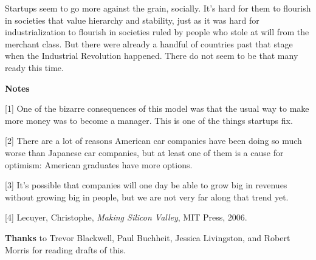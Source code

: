 Startups
                  seem to go more against the grain, socially. It's hard for
                  them to flourish in societies that value hierarchy and
                  stability, just as it was hard for industrialization to
                  flourish in societies ruled by people who stole at will from
                  the merchant class. But there were already a handful of
                  countries past that stage when the Industrial Revolution
                  happened. There do not seem to be that many ready this
                  time.








                  \textbf{Notes}

[1] One of the bizarre consequences of this model was that the
                  usual way to make more money was to become a manager. This is
                  one of the things startups fix.

[2] There are a lot of reasons American car companies have been
                  doing so much worse than Japanese car companies, but at least
                  one of them is a cause for optimism: American graduates have
                  more options.

[3] It's possible that companies will one day be able to grow
                  big in revenues without growing big in people, but we are not
                  very far along that trend yet.

[4] Lecuyer, Christophe, \emph{Making Silicon Valley}, MIT
                  Press, 2006.

\textbf{Thanks} to Trevor Blackwell,
                  Paul Buchheit, Jessica Livingston, and Robert Morris for
                  reading drafts of this.


              
            
          
            
              
                


                  
              
            
          
